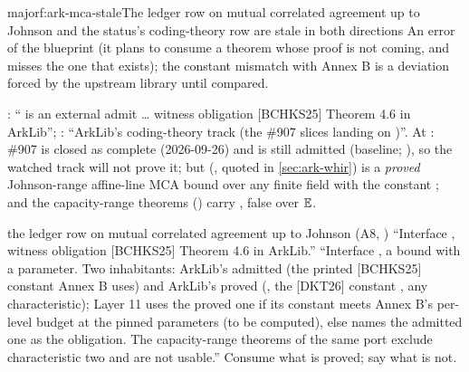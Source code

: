 \begin{finding}{major}{f:ark-mca-stale}{The ledger row on mutual correlated agreement up to Johnson and the status's coding-theory row are stale in both directions}
 An error of the blueprint (it plans to consume a theorem whose proof is
not coming, and misses the one that exists); the constant mismatch with Annex B is a deviation
forced by the upstream library until compared.

 : `` is an external admit
\ldots{} witness obligation [BCHKS25] Theorem 4.6 in ArkLib''; : ``ArkLib's
coding-theory track (the \#907 slices landing on )''. At : \#907 is
closed as complete (2026-09-26) and  is still admitted
(baseline; ), so the watched track will not prove it; but
 (, quoted
in \cref{sec:ark-whir}) is a \emph{proved} Johnson-range affine-line MCA bound over any finite
field with the constant ; and the capacity-range theorems
() carry , false
over $\mathbb{E}$.

\begin{change}{the ledger row on mutual correlated agreement up to Johnson (A8, )}
\asis ``Interface , witness obligation [BCHKS25] Theorem 4.6 in ArkLib.''
\asproposed ``Interface , a bound
 with  a parameter.
Two inhabitants: ArkLib's admitted  (the printed [BCHKS25]
constant Annex B uses) and ArkLib's proved 
(, the [DKT26] constant , any characteristic); Layer
11 uses the proved one if its constant meets Annex B's per-level budget at the pinned parameters
(to be computed), else names the admitted one as the obligation. The capacity-range theorems of
the same port exclude characteristic two and are not usable.''
\reason Consume what is proved; say what is not.
\end{change}
\end{finding}


